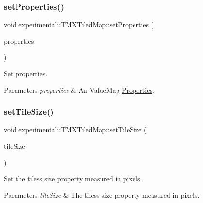 \subsubsection{\texorpdfstring{set\+Properties()}{setProperties()}\hspace{0.1cm}{\footnotesize\ttfamily [2/2]}}
{\footnotesize\ttfamily void experimental\+::\+T\+M\+X\+Tiled\+Map\+::set\+Properties (\begin{DoxyParamCaption}\item[{const Value\+Map \&}]{properties }\end{DoxyParamCaption})\hspace{0.3cm}{\ttfamily [inline]}}

Set properties.


\begin{DoxyParams}{Parameters}
{\em properties} & An Value\+Map \hyperlink{classProperties}{Properties}. \\
\hline
\end{DoxyParams}
\mbox{\label{classexperimental_1_1TMXTiledMap_a8df9d7d1417094650d8bb83beae0ad18}} 
\subsubsection{\texorpdfstring{set\+Tile\+Size()}{setTileSize()}\hspace{0.1cm}{\footnotesize\ttfamily [1/2]}}
{\footnotesize\ttfamily void experimental\+::\+T\+M\+X\+Tiled\+Map\+::set\+Tile\+Size (\begin{DoxyParamCaption}\item[{const \hyperlink{classSize}{Size} \&}]{tile\+Size }\end{DoxyParamCaption})\hspace{0.3cm}{\ttfamily [inline]}}

Set the tiles\textquotesingle{}s size property measured in pixels.


\begin{DoxyParams}{Parameters}
{\em tile\+Size} & The tiles\textquotesingle{}s size property measured in pixels. \\
\hline
\end{DoxyParams}
\mbox{\label{classexperimental_1_1TMXTiledMap_a8df9d7d1417094650d8bb83beae0ad18}} 
